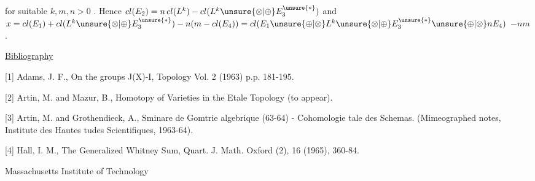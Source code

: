 
for suitable $k,m,n > 0$ . Hence $cl(E_2) = n\,cl(L^k) - cl(L^k \unsure{\otimes|\oplus} E_3^{\unsure{*}})$
and $x = cl(E_1) + cl(L^k \unsure{\otimes|\oplus} E_3^{\unsure{*}}) - n(m - cl(E_4)) = cl(E_1 \unsure{\oplus|\otimes} L^k \unsure{\otimes|\oplus} E_3^{\unsure{*}} \unsure{\oplus|\otimes} nE_4)$
$- nm$ .

\uline{Bibliography}

[1] Adams, J. F., On the groups J(X)-I, Topology Vol. 2 (1963)
p.p. 181-195.

[2] Artin, M. and Mazur, B., Homotopy of Varieties in the
Etale Topology (to appear).

[3] Artin, M. and Grothendieck, A., Sminare de Gomtrie
algebrique (63-64) - Cohomologie tale des Schemas.
(Mimeographed notes, Institute des Hautes tudes 
Scientifiques, 1963-64).

[4] Hall, I. M., The Generalized Whitney Sum, Quart. J. Math.
Oxford (2), 16 (1965), 360-84.

Massachusetts Institute of Technology

